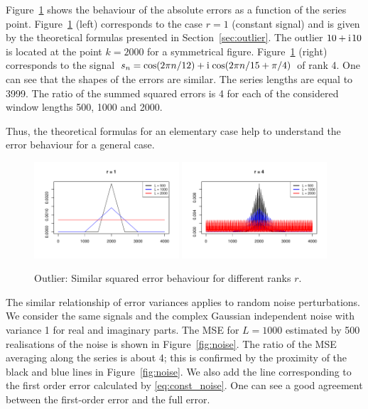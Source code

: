 \documentclass[engproc, submit, article,pdftex,moreauthors]{Definitions/mdpi}
\newcommand{\iu}{\mathrm{i}\mkern2mu}
\begin{document}
Figure~\ref{fig:outlier} shows the behaviour of the absolute errors as a function of the series point. Figure~\ref{fig:outlier} (left) corresponds to the case $r=1$ (constant signal) and is given by the theoretical formulas presented in Section~\ref{sec:outlier}. The outlier $10+\iu 10$ is located at the point $k=2000$ for a symmetrical figure.
Figure~\ref{fig:outlier} (right) corresponds to the signal $s_n = \cos(2\pi n/12) + \iu \cos(2\pi n/15 + \pi/4)$ of rank 4. One can see that the shapes of the errors are similar. The series lengths are equal to 3999. The ratio of the summed squared errors is 4 for each of the considered window lengths 500, 1000 and 2000.

Thus, the theoretical formulas for an elementary case help to understand the error behaviour for a general case.

\begin{figure}[!htb]
    \centering
        \includegraphics[width=0.48\textwidth]{img/const_outl_err_1}
        \includegraphics[width=0.48\textwidth]{img/const_outl_err_4}
    \caption{Outlier: Similar squared error behaviour for different ranks $r$.}
    \label{fig:outlier}
\end{figure}

The similar relationship of error variances applies to random noise perturbations. We consider the same signals and the complex Gaussian independent noise with variance 1 for real and imaginary parts. The MSE for $L=1000$ estimated by 500 realisations of the noise is shown in Figure~\ref{fig:noise}. The ratio of the MSE averaging along the series is about 4; this is confirmed by the proximity of the black and blue lines in Figure~\ref{fig:noise}. We also add the line corresponding to the first order error calculated by \eqref{eq:const_noise}. One can see a good agreement between the first-order error and the full error.
\end{document}
